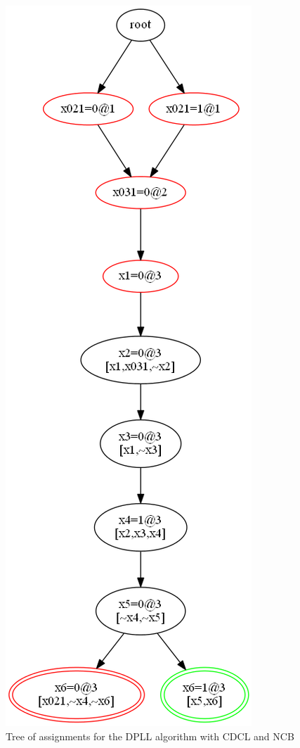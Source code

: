 \documentclass[11pt]{report}
\begin{document}
\begin{figure}
\begin{center}
\includegraphics[keepaspectratio=true,height=.9\textheight]{tree3-color}
\end{center}
\caption{Tree of assignments for the DPLL algorithm with CDCL and NCB}\label{tree3}
\end{figure}
\end{document}
